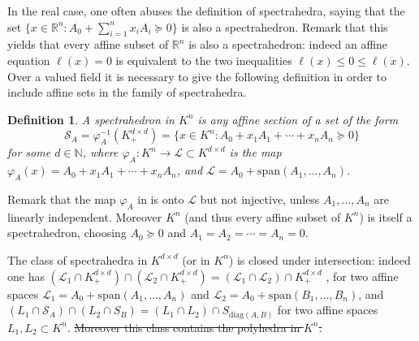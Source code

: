 \documentclass[sigconf]{acmart}
\renewcommand{\span}[1]{{\mathrm{span}(#1)}} %
\newtheorem{definition}[theorem]{Definition}
\def\diag{\mathrm{diag}}
\providecommand{\DIFdeltex}[1]{{\protect\color{red}\sout{#1}}}                      %
\providecommand{\DIFdelbegin}{} %
\providecommand{\DIFdelend}{} %
\providecommand{\DIFdel}[1]{\texorpdfstring{\DIFdeltex{#1}}{}} %
\newcommand{\DIFscaledelfig}{0.5}
\newlength{\DIFdelgraphicswidth} %
\newlength{\DIFdelgraphicsheight} %
\newcommand{\DIFdelincludegraphics}[2][]{%
\sbox{\DIFdelgraphicsbox}{\DIFOincludegraphics[#1]{#2}}%
\settoboxwidth{\DIFdelgraphicswidth}{\DIFdelgraphicsbox} %
\settoboxtotalheight{\DIFdelgraphicsheight}{\DIFdelgraphicsbox} %
\scalebox{\DIFscaledelfig}{%
\parbox[b]{\DIFdelgraphicswidth}{\usebox{\DIFdelgraphicsbox}\\[-\baselineskip] \rule{\DIFdelgraphicswidth}{0em}}\llap{\resizebox{\DIFdelgraphicswidth}{\DIFdelgraphicsheight}{%
\setlength{\unitlength}{\DIFdelgraphicswidth}%
\begin{picture}(1,1)%
\thicklines\linethickness{2pt} %
{\color[rgb]{1,0,0}\put(0,0){\framebox(1,1){}}}%
{\color[rgb]{1,0,0}\put(0,0){\line( 1,1){1}}}%
{\color[rgb]{1,0,0}\put(0,1){\line(1,-1){1}}}%
\end{picture}%
}\hspace*{3pt}}} %
} %
\DeclareRobustCommand{\DIFdelbegin}{\DIFOdelbegin \let\includegraphics\DIFdelincludegraphics} %
\DeclareRobustCommand{\DIFdelend}{\DIFOaddend \let\includegraphics\DIFOincludegraphics} %
\begin{document}
In the real case, one often abuses the definition of spectrahedra, saying that the set
$\{x \in \mathbb{R}^n : A_0+\sum_{i=1}^n x_iA_i \succeq 0\}$ is also a spectrahedron.
Remark that this yields that every affine subset of $\mathbb{R}^n$ is also
a spectrahedron: indeed an affine equation $\ell(x) = 0$ is equivalent to the two inequalities
$\ell(x) \leq 0 \leq \ell(x)$. Over a valued field it is necessary to give the following
definition in order to include affine sets in the family of spectrahedra.

\begin{definition}
  \label{def_spectrahedra_Kn}
  A \emph{spectrahedron in $K^n$} is any affine section of a set of the form
  $$
  \mathcal{S}_A = \varphi_A^{-1}(K^{d \times d}_+) = \{x \in K^n : A_0+x_1A_1+\cdots+x_nA_n \succeq 0\}
  $$
  for some $d\in \mathbb{N}$,
  where $\varphi_A : K^n \to \mathcal{L} \subset K^{d \times d}$ is the map
  $\varphi_A(x) = A_0+x_1A_1+\cdots+x_nA_n$, and $\mathcal{L} = A_0+\span{A_1,\ldots,A_n}$.
\end{definition}

Remark that the map $\varphi_A$ in  is onto $\mathcal{L}$ but not
injective, unless $A_1,\ldots,A_n$ are linearly independent. Moreover $K^n$ (and thus every affine
subset of $K^n$) is itself a spectrahedron, choosing $A_0 \succeq 0$ and $A_1=A_2=\cdots=A_n=0$.

The class of spectrahedra in $K^{d \times d}$ (or in $K^n$) is closed under intersection: indeed one
has $(\mathcal{L}_1 \cap K^{d \times d}_+) \cap (\mathcal{L}_2 \cap K^{d \times d}_+) =
(\mathcal{L}_1 \cap \mathcal{L}_2) \cap K^{d \times d}_+$
, for two affine spaces
$\mathcal{L}_1 = A_0+\span{A_1,\ldots,A_n}$ and $\mathcal{L}_2 = A_0+\span{B_1,\ldots,B_n}$,
and
$(L_1 \cap \mathcal{S}_A) \cap (L_2 \cap S_B) = (L_1\cap L_2) \cap S_{\diag(A,B)}$ for
two affine spaces $L_1,L_2 \subset K^n$.
\DIFdelbegin \DIFdel{Moreover this class contains the polyhedra in $K^n$.
}\DIFdelend %
\end{document}
